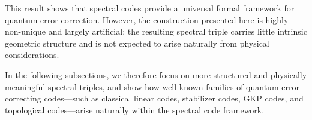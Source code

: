 \documentclass[12pt]{article}
\newcommand{\im}{\mathrm{i}}
\theoremstyle{definition} %
\theoremstyle{plain} %
\theoremstyle{remark} %
\theoremstyle{underline}
\begin{document}






This result shows that spectral codes provide a universal formal framework for quantum error correction. However, the construction presented here is highly non-unique and largely artificial: the resulting spectral triple carries little intrinsic geometric structure and is not expected to arise naturally from physical considerations.

In the following subsections, we therefore focus on more structured and physically meaningful spectral triples, and show how well-known families of quantum error correcting codes—such as classical linear codes\cite{macwilliams1977theory}, stabilizer codes\cite{gottesman1997stabilizer}, GKP codes\cite{gottesman2000encoding}, and topological codes\cite{Kitaev:1997wr}—arise naturally within the spectral code framework.
\end{document}
